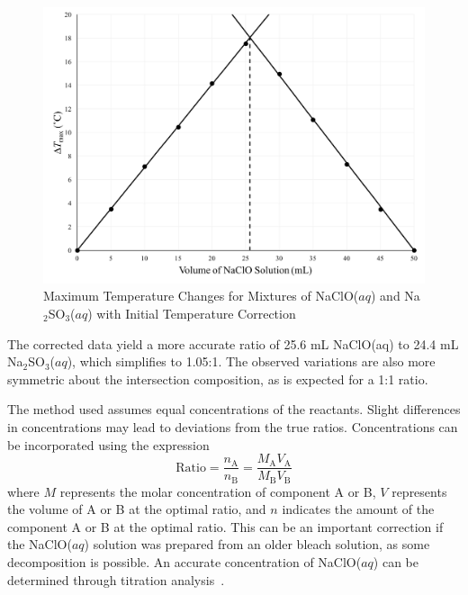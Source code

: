 \begin{figure}[htbp]
\centering
\includegraphics[width=\textwidth]{Bleach_Na2SO3_Variations_Corrected.png}
\caption{Maximum Temperature Changes for Mixtures of NaClO($aq$) and Na$_2$SO$_3$($aq$) with Initial Temperature Correction}   %
\label{fig:var_Na2SO3_corr}
\end{figure}

The corrected data yield a more accurate ratio of 25.6 mL NaClO(aq) to 24.4 mL Na$_2$SO$_3$($aq$), 
which simplifies to 1.05:1.  The observed variations are also more symmetric about the intersection composition, as is expected for a 1:1 ratio.  

The method used assumes equal concentrations of the reactants.  Slight differences in concentrations may lead to deviations from the true ratios.  
Concentrations can be incorporated using the expression
\begin{displaymath}
\mathrm{Ratio} = \frac{n_\mathrm{A}}{n_\mathrm{B}} = \frac{M_\mathrm{A}V_\mathrm{A}}{M_\mathrm{B}V_\mathrm{B}}
\end{displaymath}
where $M$ represents the molar concentration of component A or B, $V$ represents the volume of A or B at the optimal ratio, and $n$ indicates the amount
of the component A or B at the optimal ratio.  
This can be an important correction if the NaClO($aq$) solution was prepared from an older bleach solution, as some decomposition is possible.  An accurate 
concentration of NaClO($aq$) can be determined through titration analysis~\cite{vonderbrink}.  

